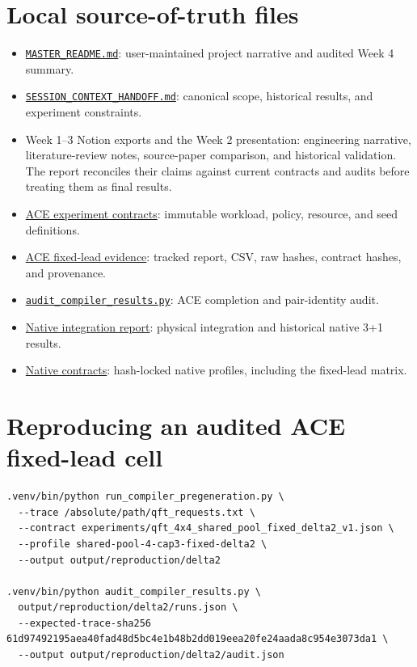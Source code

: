 \documentclass[11pt,a4paper]{report}
\begin{document}
\section{Local source-of-truth files}
\begin{itemize}
\item \href{https://github.com/sanjeevkrishnaa/Compiler-Driven-ACE/blob/codex/strict-compiler-4plus0/MASTER_README.md}{\texttt{MASTER\_README.md}}:
user-maintained project narrative and audited Week 4 summary.
\item \href{https://github.com/sanjeevkrishnaa/Compiler-Driven-ACE/blob/codex/strict-compiler-4plus0/SESSION_CONTEXT_HANDOFF.md}{\texttt{SESSION\_CONTEXT\_HANDOFF.md}}:
canonical scope, historical results, and experiment constraints.
\item Week 1--3 Notion exports and the Week 2 presentation: engineering
narrative, literature-review notes, source-paper comparison, and historical
validation. The report reconciles their claims against current contracts and
audits before treating them as final results.
\item \href{https://github.com/sanjeevkrishnaa/Compiler-Driven-ACE/tree/codex/strict-compiler-4plus0/experiments}{ACE experiment contracts}:
immutable workload, policy, resource, and seed definitions.
\item \href{https://github.com/sanjeevkrishnaa/Compiler-Driven-ACE/tree/codex/strict-compiler-4plus0/results/ace_fixed_lead_sensitivity_30seed_v1}{ACE fixed-lead evidence}:
tracked report, CSV, raw hashes, contract hashes, and provenance.
\item \href{https://github.com/sanjeevkrishnaa/Compiler-Driven-ACE/blob/codex/strict-compiler-4plus0/audit_compiler_results.py}{\texttt{audit\_compiler\_results.py}}:
ACE completion and pair-identity audit.
\item \href{https://github.com/sanjeevkrishnaa/SeQUeNCe/blob/codex/native-compiler-4x4-physical/docs/native-compiler-4x4-update.md}{Native integration report}:
physical integration and historical native 3+1 results.
\item \href{https://github.com/sanjeevkrishnaa/SeQUeNCe/tree/codex/native-compiler-4x4-physical/example/multicore_entanglement/contracts}{Native contracts}:
hash-locked native profiles, including the fixed-lead matrix.
\end{itemize}

\section{Reproducing an audited ACE fixed-lead cell}
\begin{verbatim}
.venv/bin/python run_compiler_pregeneration.py \
  --trace /absolute/path/qft_requests.txt \
  --contract experiments/qft_4x4_shared_pool_fixed_delta2_v1.json \
  --profile shared-pool-4-cap3-fixed-delta2 \
  --output output/reproduction/delta2

.venv/bin/python audit_compiler_results.py \
  output/reproduction/delta2/runs.json \
  --expected-trace-sha256 61d97492195aea40fad48d5bc4e1b48b2dd019eea20fe24aada8c954e3073da1 \
  --output output/reproduction/delta2/audit.json
\end{verbatim}
\end{document}
